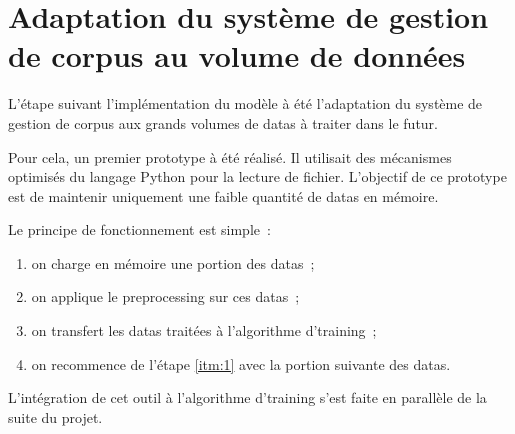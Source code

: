\section{Adaptation du système de gestion de corpus au volume de données}
L'étape suivant l'implémentation du modèle à été l'adaptation du système de gestion de corpus aux grands volumes de \glspl{data} à traiter dans le futur.

Pour cela, un premier prototype à été réalisé.
Il utilisait des mécanismes optimisés du langage Python pour la lecture de fichier.
L'objectif de ce prototype est de maintenir uniquement une faible quantité de \glspl{data} en mémoire.

Le principe de fonctionnement est simple~:
\begin{enumerate}
	\item on charge en mémoire une portion des \glspl{data}~; \label{itm:1}
	\item on applique le \gls{preprocessing} sur ces \glspl{data}~;
	\item on transfert les \glspl{data} traitées à l'algorithme d'\gls{training}~;
	\item on recommence de l'étape \ref{itm:1} avec la portion suivante des \glspl{data}.
\end{enumerate}
\vspace{1em}

L'intégration de cet outil à l'algorithme d'\gls{training} s'est faite en parallèle de la suite du projet.